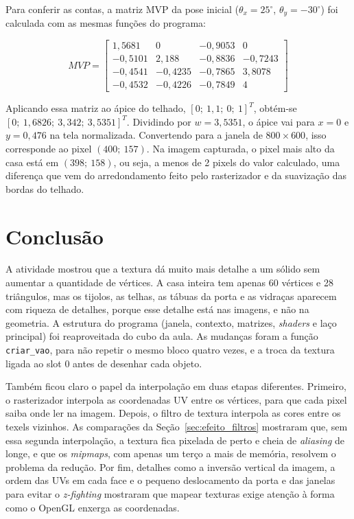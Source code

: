 \documentclass{article}
\begin{document}
Para conferir as contas, a matriz MVP da pose inicial ($\theta_x = 25^\circ$, $\theta_y = -30^\circ$) foi calculada com as mesmas funções do programa:

\begin{equation}
MVP = \begin{bmatrix}
1{,}5681  & 0         & -0{,}9053 & 0 \\
-0{,}5101 & 2{,}188   & -0{,}8836 & -0{,}7243 \\
-0{,}4541 & -0{,}4235 & -0{,}7865 & 3{,}8078 \\
-0{,}4532 & -0{,}4226 & -0{,}7849 & 4
\end{bmatrix}
\end{equation}

Aplicando essa matriz ao ápice do telhado, $[0;\ 1{,}1;\ 0;\ 1]^T$, obtém-se $[0;\ 1{,}6826;\ 3{,}342;\ 3{,}5351]^T$. Dividindo por $w = 3{,}5351$, o ápice vai para $x = 0$ e $y = 0{,}476$ na tela normalizada. Convertendo para a janela de $800\times600$, isso corresponde ao pixel $(400;\ 157)$. Na imagem capturada, o pixel mais alto da casa está em $(398;\ 158)$, ou seja, a menos de 2 pixels do valor calculado, uma diferença que vem do arredondamento feito pelo rasterizador e da suavização das bordas do telhado.

\section{Conclusão}

A atividade mostrou que a textura dá muito mais detalhe a um sólido sem aumentar a quantidade de vértices. A casa inteira tem apenas 60 vértices e 28 triângulos, mas os tijolos, as telhas, as tábuas da porta e as vidraças aparecem com riqueza de detalhes, porque esse detalhe está nas imagens, e não na geometria. A estrutura do programa (janela, contexto, matrizes, \textit{shaders} e laço principal) foi reaproveitada do cubo da aula. As mudanças foram a função \texttt{criar\_vao}, para não repetir o mesmo bloco quatro vezes, e a troca da textura ligada ao slot 0 antes de desenhar cada objeto.

Também ficou claro o papel da interpolação em duas etapas diferentes. Primeiro, o rasterizador interpola as coordenadas UV entre os vértices, para que cada pixel saiba onde ler na imagem. Depois, o filtro de textura interpola as cores entre os texels vizinhos. As comparações da Seção~\ref{sec:efeito_filtros} mostraram que, sem essa segunda interpolação, a textura fica pixelada de perto e cheia de \textit{aliasing} de longe, e que os \textit{mipmaps}, com apenas um terço a mais de memória, resolvem o problema da redução. Por fim, detalhes como a inversão vertical da imagem, a ordem das UVs em cada face e o pequeno deslocamento da porta e das janelas para evitar o \textit{z-fighting} mostraram que mapear texturas exige atenção à forma como o OpenGL enxerga as coordenadas.
\end{document}
